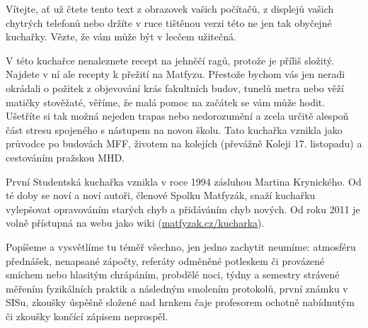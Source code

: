 \noindent Vítejte, ať už čtete tento text z obrazovek vašich počítačů,
z displejů vašich chytrých telefonů nebo držíte v ruce tištěnou verzi této ne
jen tak obyčejné kuchařky. Vězte, že vám může být v lecčem užitečná.


V této kuchařce nenaleznete recept na jehněčí ragů, protože je příliš složitý.
Najdete v ní ale recepty k přežití na Matfyzu.
Přestože bychom vás jen neradi okrádali o požitek z objevování krás
fakultních budov, tunelů metra nebo věží matičky stověžaté, věříme,
že malá pomoc na začátek se vám může hodit.
Ušetříte si tak možná nejeden trapas nebo nedorozumění a zcela určitě
alespoň část stresu spojeného s nástupem na novou školu.
Tato kuchařka vznikla jako průvodce po budovách MFF,
životem na kolejích (převážně Koleji 17. listopadu) a cestováním pražskou MHD.


První Studentská kuchařka vznikla v roce 1994 zásluhou Martina Krynického.
Od té doby se noví a noví autoři, členové Spolku Matfyzák,
snaží kuchařku vylepšovat opravováním starých chyb a přidáváním chyb nových.
Od roku 2011 je volně přístupná na webu jako wiki
(\url{matfyzak.cz/kucharka}).


Popíšeme a vysvětlíme tu téměř všechno, jen jedno zachytit neumíme:
atmosféru přednášek, nenapsané zápočty, referáty odměněné potleskem
či provázené smíchem nebo hlasitým chrápáním, probdělé noci,
týdny a semestry strávené měřením fyzikálních praktik a následným
smolením protokolů, první známku v SISu, zkoušky úspěšně složené
nad hrnkem čaje profesorem ochotně nabídnutým či zkoušky končící
zápisem neprospěl.
